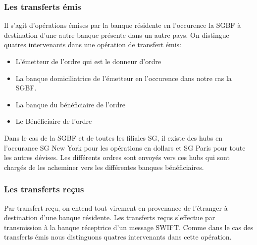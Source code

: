 \subsubsection{Les transferts émis}

Il s'agit d'opérations émises  par la banque résidente en l'occurence la SGBF
à destination d'une autre banque présente dans un autre pays. On distingue 
quatres intervenants dans une opération de transfert émis:
\begin{itemize}
  \item L'émetteur de l'ordre qui est le donneur d'ordre
  \item La banque domiciliatrice de l'émetteur en l'occurence dans notre cas la
    SGBF.
  \item La banque du bénéficiaire de l'ordre
  \item Le Bénéficiaire de l'ordre
\end{itemize}

Dans le cas de la SGBF et de toutes les filiales SG, il existe des hubs en 
l'occurance SG New York pour les opérations en dollars et SG Paris pour toute 
les autres dévises. Les différents ordres sont envoyés vers ces hubs qui sont 
chargés de les acheminer vers les différentes banques bénéficiaires.   

 \subsubsection{Les transferts reçus}
   Par transfert reçu, on entend tout virement en provenance de l'étranger à
   destination d'une banque résidente. Les transferts reçus s'effectue par 
   transmission à la banque réceptrice d'un message SWIFT. Comme dans le cas des
   transferts émis nous distinguons quatres intervenants dans cette opération.
   
